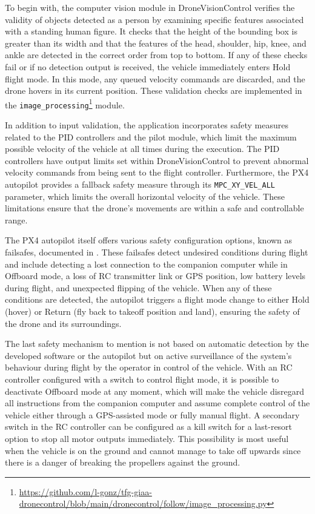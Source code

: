 To begin with, the computer vision module in DroneVisionControl verifies the validity of objects detected as a person by examining specific features associated with a standing human figure. It checks that the height of the bounding box is greater than its width and that the features of the head, shoulder, hip, knee, and ankle are detected in the correct order from top to bottom. If any of these checks fail or if no detection output is received, the vehicle immediately enters Hold flight mode. In this mode, any queued velocity commands are discarded, and the drone hovers in its current position. These validation checks are implemented in the \texttt{image\_processing}\footnote{\url{https://github.com/l-gonz/tfg-giaa-dronecontrol/blob/main/dronecontrol/follow/image_processing.py}} module.

In addition to input validation, the application incorporates safety measures related to the PID controllers and the pilot module, which limit the maximum possible velocity of the vehicle at all times during the execution. The PID controllers have output limits set within DroneVisionControl to prevent abnormal velocity commands from being sent to the flight controller. Furthermore, the PX4 autopilot provides a fallback safety measure through its \texttt{MPC\_XY\_VEL\_ALL} parameter, which limits the overall horizontal velocity of the vehicle. These limitations ensure that the drone's movements are within a safe and controllable range.

The PX4 autopilot itself offers various safety configuration options, known as failsafes, documented in  \cite{px4-docs-safety}. These failsafes detect undesired conditions during flight and include detecting a lost connection to the companion computer while in Offboard mode, a loss of RC transmitter link or GPS position, low battery levels during flight, and unexpected flipping of the vehicle. When any of these conditions are detected, the autopilot triggers a flight mode change to either Hold (hover) or Return (fly back to takeoff position and land), ensuring the safety of the drone and its surroundings.

The last safety mechanism to mention is not based on automatic detection by the developed software or the autopilot but on active surveillance of the system's behaviour during flight by the operator in control of the vehicle.
With an RC controller configured with a switch to control flight mode, it is possible to deactivate Offboard mode at any moment, which will make the vehicle disregard all instructions from the companion computer and assume complete control of the vehicle either through a GPS-assisted mode or fully manual flight.
A secondary switch in the RC controller can be configured as a kill switch for a last-resort option to stop all motor outputs immediately.
This possibility is most useful when the vehicle is on the ground and cannot manage to take off upwards since there is a danger of breaking the propellers against the ground.

